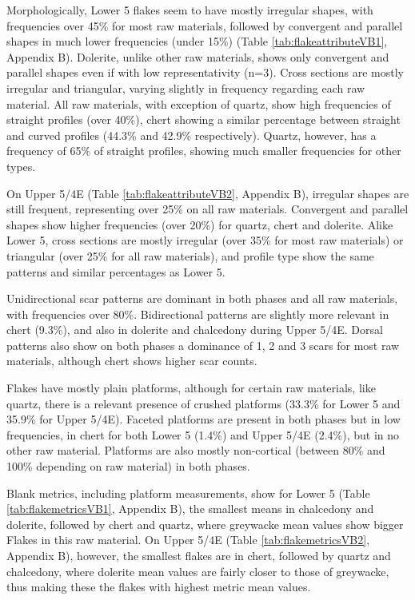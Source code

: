 \documentclass[12pt,twoside]{reedthesis}
\begin{document}
Morphologically, Lower 5 flakes seem to have mostly irregular shapes, with frequencies over 45\% for most raw materials, followed by convergent and parallel shapes in much lower frequencies (under 15\%) (Table \ref{tab:flakeattributeVB1}, Appendix B). Dolerite, unlike other raw materials, shows only convergent and parallel shapes even if with low representativity (n=3). Cross sections are mostly irregular and triangular, varying slightly in frequency regarding each raw material. All raw materials, with exception of quartz, show high frequencies of straight profiles (over 40\%), chert showing a similar percentage between straight and curved profiles (44.3\% and 42.9\% respectively). Quartz, however, has a frequency of 65\% of straight profiles, showing much smaller frequencies for other types.

On Upper 5/4E (Table \ref{tab:flakeattributeVB2}, Appendix B), irregular shapes are still frequent, representing over 25\% on all raw materials. Convergent and parallel shapes show higher frequencies (over 20\%) for quartz, chert and dolerite. Alike Lower 5, cross sections are mostly irregular (over 35\% for most raw materials) or triangular (over 25\% for all raw materials), and profile type show the same patterns and similar percentages as Lower 5.

Unidirectional scar patterns are dominant in both phases and all raw materials, with frequencies over 80\%. Bidirectional patterns are slightly more relevant in chert (9.3\%), and also in dolerite and chalcedony during Upper 5/4E. Dorsal patterns also show on both phases a dominance of 1, 2 and 3 scars for most raw materials, although chert shows higher scar counts.

Flakes have mostly plain platforms, although for certain raw materials, like quartz, there is a relevant presence of crushed platforms (33.3\% for Lower 5 and 35.9\% for Upper 5/4E). Faceted platforms are present in both phases but in low frequencies, in chert for both Lower 5 (1.4\%) and Upper 5/4E (2.4\%), but in no other raw material. Platforms are also mostly non-cortical (between 80\% and 100\% depending on raw material) in both phases.

Blank metrics, including platform measurements, show for Lower 5 (Table \ref{tab:flakemetricsVB1}, Appendix B), the smallest means in chalcedony and dolerite, followed by chert and quartz, where greywacke mean values show bigger Flakes in this raw material. On Upper 5/4E (Table \ref{tab:flakemetricsVB2}, Appendix B), however, the smallest flakes are in chert, followed by quartz and chalcedony, where dolerite mean values are fairly closer to those of greywacke, thus making these the flakes with highest metric mean values.
\end{document}
